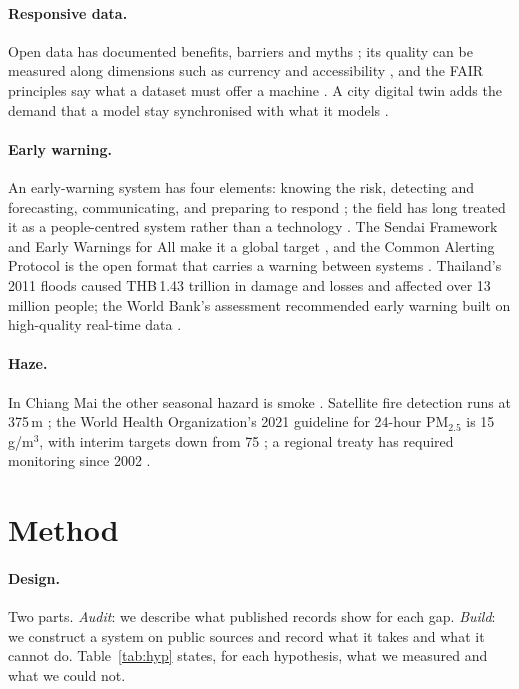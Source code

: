 \documentclass[10pt,twocolumn,a4paper]{article}
\begin{document}
\paragraph{Responsive data.}
Open data has documented benefits, barriers and myths \citep{janssen2012open}; its quality can be measured along dimensions such as currency and accessibility \citep{vetro2016,zaveri2016}, and the FAIR principles say what a dataset must offer a machine \citep{wilkinson2016}. A city digital twin adds the demand that a model stay synchronised with what it models \citep{batty2018,bolton2018gemini}.

\paragraph{Early warning.}
An early-warning system has four elements: knowing the risk, detecting and forecasting, communicating, and preparing to respond \citep{wmo2018mhews}; the field has long treated it as a people-centred system rather than a technology \citep{basher2006,sorensen2000}. The Sendai Framework and Early Warnings for All make it a global target \citep{unga2015sendai,wmo2023ew4all}, and the Common Alerting Protocol is the open format that carries a warning between systems \citep{oasis2010cap}. Thailand's 2011 floods caused THB\,1.43 trillion in damage and losses and affected over 13 million people; the World Bank's assessment recommended early warning built on high-quality real-time data \citep{worldbank2012thaiflood}.

\paragraph{Haze.}
In Chiang Mai the other seasonal hazard is smoke \citep{chantara2012,inlaung2022}. Satellite fire detection runs at 375\,m \citep{schroeder2014}; the World Health Organization's 2021 guideline for 24-hour PM$_{2.5}$ is 15\,\textmu g/m$^3$, with interim targets down from 75 \citep{who2021aqg}; a regional treaty has required monitoring since 2002 \citep{asean2002haze}.

\section{Method}
\paragraph{Design.} Two parts. \emph{Audit}: we describe what published records show for each gap. \emph{Build}: we construct a system on public sources and record what it takes and what it cannot do. Table~\ref{tab:hyp} states, for each hypothesis, what we measured and what we could not.
\end{document}
